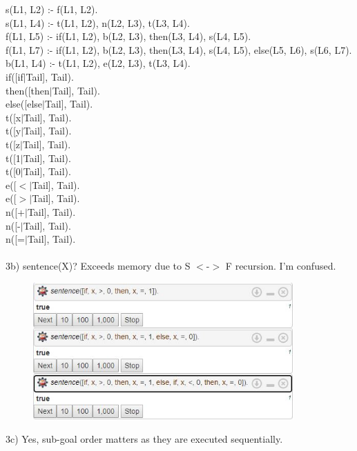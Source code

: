 \documentclass[12pt]{article}
\begin{document}
\noindent s(L1, L2) :- f(L1, L2).\\
s(L1, L4) :- t(L1, L2), n(L2, L3), t(L3, L4).\\

\noindent f(L1, L5) :- if(L1, L2), b(L2, L3), then(L3, L4), s(L4, L5).\\
\noindent f(L1, L7) :- if(L1, L2), b(L2, L3), then(L3, L4), s(L4, L5), else(L5, L6), s(L6, L7).\\

\noindent b(L1, L4) :- t(L1, L2), e(L2, L3), t(L3, L4).\\

\noindent if([if$|$Tail], Tail).\\
then([then$|$Tail], Tail).\\
else([else$|$Tail], Tail).\\

\noindent t([x$|$Tail], Tail).\\
t([y$|$Tail], Tail).\\
t([z$|$Tail], Tail).\\
t([1$|$Tail], Tail).\\
t([0$|$Tail], Tail).\\

\noindent e([$<$$|$Tail], Tail).\\
e([$>$$|$Tail], Tail).\\

\noindent n([+$|$Tail], Tail).\\
n([-$|$Tail], Tail).\\
n([=$|$Tail], Tail).\\\\


\noindent 3b) sentence(X)? Exceeds memory due to S $<$-$>$ F recursion. I'm confused.
\begin{figure}[h!]
	\centering
	\includegraphics[width=100mm,scale=1]{Q3b.JPG}
\end{figure}

\noindent 3c) Yes, sub-goal order matters as they are executed sequentially.\\
\end{document}
